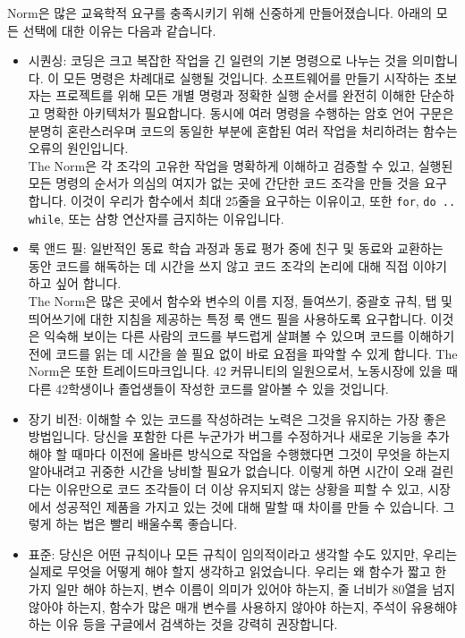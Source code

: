 \documentclass{42-ko}
\begin{document}
        Norm은 많은 교육학적 요구를 충족시키기 위해 신중하게 만들어졌습니다. 아래의
        모든 선택에 대한 이유는 다음과 같습니다.
        \begin{itemize}

        \item 시퀀싱: 코딩은 크고 복잡한 작업을 긴 일련의 기본 명령으로 나누는 것을 의미합니다.
          이 모든 명령은 차례대로 실행될 것입니다. 소프트웨어를 만들기 시작하는 초보자는 프로젝트를 위해 
          모든 개별 명령과 정확한 실행 순서를 완전히 이해한 단순하고 명확한 아키텍처가 필요합니다.
          동시에 여러 명령을 수행하는 암호 언어 구문은 분명히 혼란스러우며 코드의 동일한 부분에 혼합된 
          여러 작업을 처리하려는 함수는 오류의 원인입니다.\\
          The Norm은 각 조각의 고유한 작업을 명확하게 이해하고 검증할 수 있고, 실행된 모든 명령의 순서가 
          의심의 여지가 없는 곳에 간단한 코드 조각을 만들 것을 요구합니다. 이것이 우리가 함수에서 
          최대 25줄을 요구하는 이유이고, 또한 \texttt{for}, \texttt{do .. while}, 또는 삼항 연산자를 
          금지하는 이유입니다.

        \item 룩 앤드 필: 일반적인 동료 학습 과정과 동료 평가 중에 친구 및 동료와 교환하는 동안 
          코드를 해독하는 데 시간을 쓰지 않고 코드 조각의 논리에 대해 직접 이야기하고 싶어 합니다.\\
          The Norm은 많은 곳에서 함수와 변수의 이름 지정, 들여쓰기, 중괄호 규칙, 탭 및 띄어쓰기에 
          대한 지침을 제공하는 특정 룩 앤드 필을 사용하도록 요구합니다. 이것은 익숙해 보이는 
          다른 사람의 코드를 부드럽게 살펴볼 수 있으며 코드를 이해하기 전에 코드를 읽는 데 시간을 쓸 필요 
          없이 바로 요점을 파악할 수 있게 합니다. The Norm은 또한 트레이드마크입니다. 42 커뮤니티의 
          일원으로서, 노동시장에 있을 때 다른 42학생이나 졸업생들이 작성한 코드를 알아볼 수 있을 것입니다.

        \item 장기 비전: 이해할 수 있는 코드를 작성하려는 노력은 그것을 유지하는 가장 좋은 방법입니다.
          당신을 포함한 다른 누군가가 버그를 수정하거나 새로운 기능을 추가해야 할 때마다 이전에 올바른 
          방식으로 작업을 수행했다면 그것이 무엇을 하는지 알아내려고 귀중한 시간을 낭비할 필요가 없습니다.
          이렇게 하면 시간이 오래 걸린다는 이유만으로 코드 조각들이 더 이상 유지되지 않는 상황을 피할 수 있고,
          시장에서 성공적인 제품을 가지고 있는 것에 대해 말할 때 차이를 만들 수 있습니다. 그렇게 하는 법은 
          빨리 배울수록 좋습니다.

        \item 표준: 당신은 어떤 규칙이나 모든 규칙이 임의적이라고 생각할 수도 있지만, 우리는 실제로 무엇을 어떻게 
          해야 할지 생각하고 읽었습니다. 우리는 왜 함수가 짧고 한 가지 일만 해야 하는지, 변수 이름이 의미가 있어야 
          하는지, 줄 너비가 80열을 넘지 않아야 하는지, 함수가 많은 매개 변수를 사용하지 않아야 하는지, 주석이 
          유용해야 하는 이유 등을 구글에서 검색하는 것을 강력히 권장합니다.

        \end{itemize}
\end{document}
